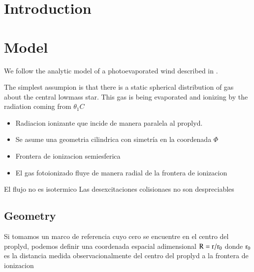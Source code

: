 \documentclass{article}
\begin{document}


\section{Introduction}
\label{sec:introduction}


\section{Model}
\label{sec:model}

We follow the analytic model of a photoevaporated wind described in \citet{1998AJ....116..322H}.
 
The simplest assumpion is that there is a static spherical distribution of gas about the central lowmass star. This gas is being evaporated and ionizing by the radiation coming from $\theta_1 C$

\begin{itemize}
\item{Radiacion ionizante que incide de manera paralela al proplyd.}
\item{Se asume una geometria cilindrica con simetría en la coordenada $\Phi$}
\item{Frontera de ionizacion semiesferica}
\item{El gas fotoionizado fluye de manera radial de la frontera de ionizacion}
\end{itemize}

El flujo no es isotermico
Las desexcitaciones colisionaes no son despreciables

\subsection{Geometry}
\label{sec:geometry}

Si tomamos un marco de referencia cuyo cero se encuentre en el centro
del proplyd, podemos definir una coordenada espacial adimensional $\rm
R = r / r_0$ donde $\rm r_0$ es la distancia medida observacionalmente
del centro del proplyd a la frontera de ionizacion
\end{document}
